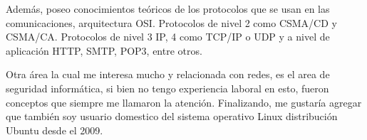 Además, poseo conocimientos teóricos de los protocolos que se usan en las comunicaciones, arquitectura OSI. Protocolos de nivel 2 como CSMA/CD y CSMA/CA. Protocolos de nivel 3 IP, 4 como TCP/IP o UDP y a nivel de aplicación HTTP, SMTP, POP3, entre otros.

Otra área la cual me interesa mucho y relacionada con redes, es el area de seguridad informática, si bien no tengo
experiencia laboral en esto, fueron conceptos que siempre me llamaron la atención. Finalizando, me gustaría agregar que también soy usuario domestico del sistema operativo Linux distribución Ubuntu desde el 2009.
